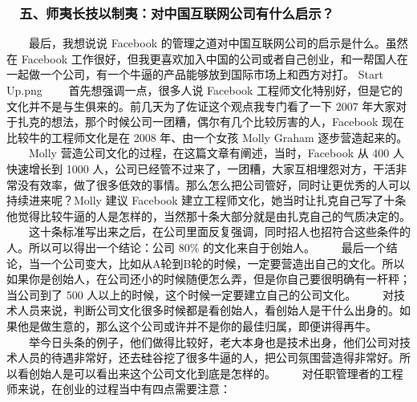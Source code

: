 \documentclass[11pt]{ctexart}
\begin{document}
\subsubsection{　五、师夷长技以制夷：对中国互联网公司有什么启示？}
\label{sec:orgheadline31}
　　最后，我想说说 Facebook 的管理之道对中国互联网公司的启示是什么。虽然在 Facebook 工作很好，但我更喜欢加入中国的公司或者自己创业，和一帮国人在一起做一个公司，有一个牛逼的产品能够放到国际市场上和西方对打。
Start Up.png
　　首先想强调一点，很多人说 Facebook 工程师文化特别好，但是它的文化并不是与生俱来的。前几天为了佐证这个观点我专门看了一下 2007 年大家对于扎克的想法，那个时候公司一团糟，偶尔有几个比较厉害的人，Facebook 现在比较牛的工程师文化是在 2008 年、由一个女孩 Molly Graham 逐步营造起来的。
　　Molly 营造公司文化的过程，在这篇文章有阐述，当时，Facebook 从 400 人快速增长到 1000 人，公司已经管不过来了，一团糟，大家互相埋怨对方，干活非常没有效率，做了很多低效的事情。那么怎么把公司管好，同时让更优秀的人可以持续进来呢？Molly 建议 Facebook 建立工程师文化，她当时让扎克自己写了十条他觉得比较牛逼的人是怎样的，当然那十条大部分就是由扎克自己的气质决定的。
　　这十条标准写出来之后，在公司里面反复强调，同时招人也招符合这些条件的人。所以可以得出一个结论：公司 80\% 的文化来自于创始人。
　　最后一个结论，当一个公司变大，比如从A轮到B轮的时候，一定要营造出自己的文化。所以如果你是创始人，在公司还小的时候随便怎么弄，但是你自己要很明确有一杆秤；当公司到了 500 人以上的时候，这个时候一定要建立自己的公司文化。
　　对技术人员来说，判断公司文化很多时候都是看创始人，看创始人是干什么出身的。如果他是做生意的，那么这个公司或许并不是你的最佳归属，即便讲得再牛。
　　举今日头条的例子，他们做得比较好，老大本身也是技术出身，他们公司对技术人员的待遇非常好，还去硅谷挖了很多牛逼的人，把公司氛围营造得非常好。所以看创始人是可以看出来这个公司文化到底是怎样的。
　　对任职管理者的工程师来说，在创业的过程当中有四点需要注意：
　
\end{document}
